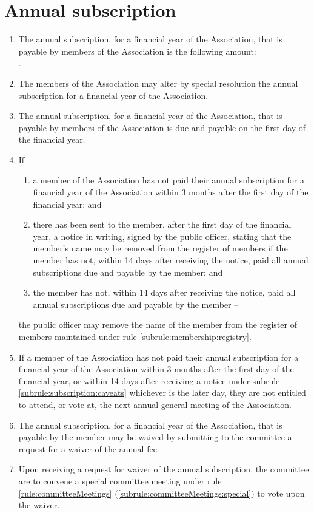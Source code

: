 \section{Annual subscription}
\label{rule:subscription}

\begin{enumerate}
	\item The annual subscription, for a financial year of the Association, that is payable by members of the Association is the following amount:\\\orgAnnualFee{}.
	\item The members of the Association may alter by special resolution the annual subscription for a financial year of the Association.
	\item The annual subscription, for a financial year of the Association, that is payable by members of the Association is due and payable on the first day of the financial year.
	
	\item \label{subrule:subscription:caveats} If --
		\begin{enumerate}
			\item a member of the Association has not paid their annual subscription for a financial year of the Association within 3 months after the first day of the financial year; and
			\item there has been sent to the member, after the first day of the financial year, a notice in writing, signed by the public officer, stating that the member's name may be removed from the register of members if the member has not, within 14 days after receiving the notice, paid all annual subscriptions due and payable by the member; and
			\item the member has not, within 14 days after receiving the notice, paid all annual subscriptions due and payable by the member --
		\end{enumerate}	the public officer may remove the name of the member from the register of members maintained under rule \ref{subrule:membership:registry}.

	\item If a member of the Association has not paid their annual subscription for a financial year of the Association within 3 months after the first day of the financial year, or within 14 days after receiving a notice under subrule \ref{subrule:subscription:caveats} whichever is the later day, they are not entitled to attend, or vote at, the next annual general meeting of the Association.

	\item \label{subrule:subscription:waiver} The annual subscription, for a financial year of the Association, that is payable by the member may be waived by submitting to the committee a request for a waiver of the annual fee.
	\item Upon receiving a request for waiver of the annual subscription, the committee are to convene a special committee meeting under rule \ref{rule:committeeMeetings} (\ref{subrule:committeeMeetings:special}) to vote upon the waiver.
\end{enumerate}
